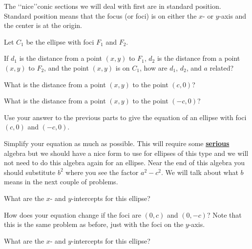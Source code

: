 The \lq\lq nice\rq\rq conic sections we will deal with first are in standard position. Standard position means that the focus (or foci) is on either the $x$- or $y$-axis and the center is at the origin.

\bq\label{q62} Let $C_1$ be the ellipse with foci $F_1$ and $F_2$.
\be
\item If $d_1$ is the distance from a point $(x,y)$ to $F_1$, $d_2$ is the distance from a point $(x,y)$ to $F_2$, and the point $(x,y)$ is on $C_1$, how are $d_1$, $d_2$, and $a$ related?
\item What is the distance from a point $(x,y)$ to the point $(c,0)$?
\item What is the distance from a point $(x,y)$ to the point $(-c,0)$?
\item Use your answer to the previous parts to give the equation of an ellipse with foci $(c,0)$ and $(-c,0)$.
\item Simplify your equation as much as possible. This will require some \textbf{\underline{serious}} algebra but we should have a nice form to use for ellipses of this type and we will not need to do this algebra again for an ellipse. Near the end of this algebra you should substitute $b^2$ where you see the factor $a^2-c^2$. We will talk about what $b$ means in the next couple of problems.
\item What are the $x$- and $y$-intercepts for this ellipse?
\ee \eq

\begin{annotation}
\end{annotation}

\bq \be
\item How does your equation change if the foci are $(0,c)$ and $(0,-c)$? Note that this is the same problem as before, just with the foci on the $y$-axis.
\item What are the $x$- and $y$-intercepts for this ellipse?
\ee \eq

